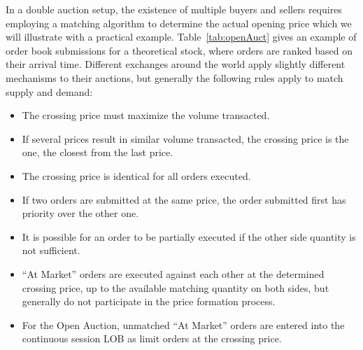 In a double auction setup, the existence of multiple buyers and sellers requires employing a matching algorithm to determine the actual opening price which we will illustrate with a practical example. Table~\ref{tab:openAuct} gives an example of order book submissions for a theoretical stock, where orders are ranked based on their arrival time. Different exchanges around the world apply slightly different mechanisms to their auctions, but generally the following rules apply to match supply and demand:
\begin{itemize}
\item The crossing price must maximize the volume transacted.
\item If several prices result in similar volume transacted, the crossing price is the one, the closest from the last price. 
\item The crossing price is identical for all orders executed.
\item If two orders are submitted at the same price, the order submitted first has priority over the other one.
\item It is possible for an order to be partially executed if the other side quantity is not sufficient.
\item ``At Market'' orders are executed against each other at the determined crossing price, up to the available matching quantity on both sides, but generally do not participate in the price formation process.
\item For the Open Auction, unmatched ``At Market'' orders are entered into the continuous session LOB as limit orders at the crossing price.
\end{itemize} 


